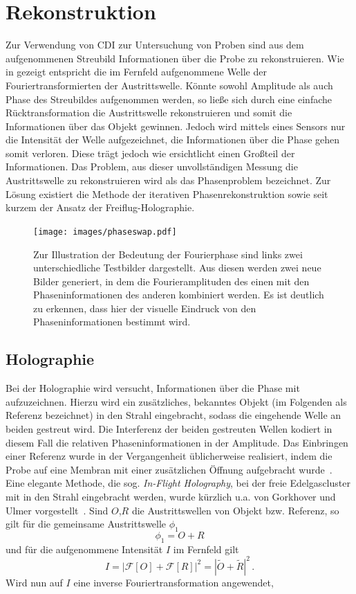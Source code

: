 \chapter{Rekonstruktion}
Zur Verwendung von CDI zur Untersuchung von Proben sind aus dem aufgenommenen Streubild Informationen über die Probe zu rekonstruieren. Wie in  gezeigt entspricht die im Fernfeld aufgenommene Welle der Fouriertransformierten der Austrittswelle. Könnte sowohl Amplitude als auch Phase des Streubildes aufgenommen werden, so ließe sich durch eine einfache Rücktransformation die Austrittswelle rekonstruieren und somit die Informationen über das Objekt gewinnen. Jedoch wird mittels eines Sensors nur die Intensität der Welle aufgezeichnet, die Informationen über die Phase gehen somit verloren. Diese trägt jedoch wie  ersichtlicht einen Großteil der Informationen. Das Problem, aus dieser unvollständigen Messung die Austrittswelle zu rekonstruieren wird als das Phasenproblem bezeichnet. Zur Lösung existiert die Methode der iterativen Phasenrekonstruktion sowie seit kurzem der Ansatz der Freiflug-Holographie.

\begin{figure}
	\centering
	\texttt{[image: images/phaseswap.pdf]}
	\caption[Bedeutung der Fourierphase]{Zur Illustration der Bedeutung der Fourierphase sind links zwei unterschiedliche Testbilder dargestellt. Aus diesen werden zwei neue Bilder generiert, in dem die Fourieramplituden des einen mit den Phaseninformationen des anderen kombiniert werden. Es ist deutlich zu erkennen, dass hier der visuelle Eindruck von den Phaseninformationen bestimmt wird.}
	\label{fig:phaseswap}
\end{figure}
\section{Holographie}
Bei der Holographie wird versucht, Informationen über die Phase mit aufzuzeichnen. Hierzu wird ein zusätzliches, bekanntes Objekt (im Folgenden als Referenz bezeichnet) in den Strahl eingebracht, sodass die eingehende Welle an beiden gestreut wird. Die Interferenz der beiden gestreuten Wellen kodiert in diesem Fall die relativen Phaseninformationen in der Amplitude.
Das Einbringen einer Referenz wurde in der Vergangenheit üblicherweise realisiert, indem die Probe auf eine Membran mit einer zusätzlichen Öffnung aufgebracht wurde~\cite{eisebitt2004}. Eine elegante Methode, die sog. \textit{In-Flight Holography}, bei der freie Edelgascluster mit in den Strahl eingebracht werden, wurde kürzlich u.a. von Gorkhover und Ulmer vorgestellt~\cite{gorkhover2016,ulmer2015}. 
Sind $O$,$R$ die Austrittswellen von Objekt bzw. Referenz, so gilt für die gemeinsame Austrittswelle $\phi_1$
\begin{equation}
	\phi_1=O+R 
\end{equation}
und für die aufgenommene Intensität $I$ im Fernfeld gilt
\begin{equation}
	I=\left|\mathscr{F}\left[O\right]+\mathscr{F}\left[R\right]\right|^2=\left|\tilde{O}+\tilde{R}\right|^2\,.
\end{equation}
Wird nun auf $I$ eine inverse Fouriertransformation angewendet,


